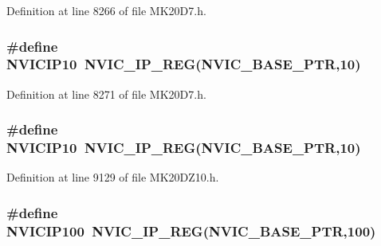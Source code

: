 Definition at line 8266 of file M\+K20\+D7.\+h.

\subsubsection[{\texorpdfstring{N\+V\+I\+C\+I\+P10}{NVICIP10}}]{\setlength{\rightskip}{0pt plus 5cm}\#define N\+V\+I\+C\+I\+P10~{\bf N\+V\+I\+C\+\_\+\+I\+P\+\_\+\+R\+EG}({\bf N\+V\+I\+C\+\_\+\+B\+A\+S\+E\+\_\+\+P\+TR},10)}\hypertarget{group___n_v_i_c___register___accessor___macros_ga7a8c043dca03fa0e80e157be6e9a56a7}{}\label{group___n_v_i_c___register___accessor___macros_ga7a8c043dca03fa0e80e157be6e9a56a7}


Definition at line 8271 of file M\+K20\+D7.\+h.

\subsubsection[{\texorpdfstring{N\+V\+I\+C\+I\+P10}{NVICIP10}}]{\setlength{\rightskip}{0pt plus 5cm}\#define N\+V\+I\+C\+I\+P10~{\bf N\+V\+I\+C\+\_\+\+I\+P\+\_\+\+R\+EG}({\bf N\+V\+I\+C\+\_\+\+B\+A\+S\+E\+\_\+\+P\+TR},10)}\hypertarget{group___n_v_i_c___register___accessor___macros_ga7a8c043dca03fa0e80e157be6e9a56a7}{}\label{group___n_v_i_c___register___accessor___macros_ga7a8c043dca03fa0e80e157be6e9a56a7}


Definition at line 9129 of file M\+K20\+D\+Z10.\+h.

\subsubsection[{\texorpdfstring{N\+V\+I\+C\+I\+P100}{NVICIP100}}]{\setlength{\rightskip}{0pt plus 5cm}\#define N\+V\+I\+C\+I\+P100~{\bf N\+V\+I\+C\+\_\+\+I\+P\+\_\+\+R\+EG}({\bf N\+V\+I\+C\+\_\+\+B\+A\+S\+E\+\_\+\+P\+TR},100)}\hypertarget{group___n_v_i_c___register___accessor___macros_gad74aee497d522e92fceb276aae606cc5}{}\label{group___n_v_i_c___register___accessor___macros_gad74aee497d522e92fceb276aae606cc5}


